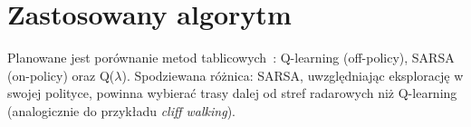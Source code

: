 \section{Zastosowany algorytm}
\label{sec:algorytm}

Planowane jest porównanie metod tablicowych~\cite{sutton2018}:
Q-learning (off-policy), SARSA (on-policy) oraz Q($\lambda$).
Spodziewana różnica: SARSA, uwzględniając eksplorację w swojej polityce,
powinna wybierać trasy dalej od stref radarowych niż Q-learning
(analogicznie do przykładu \emph{cliff walking}).

